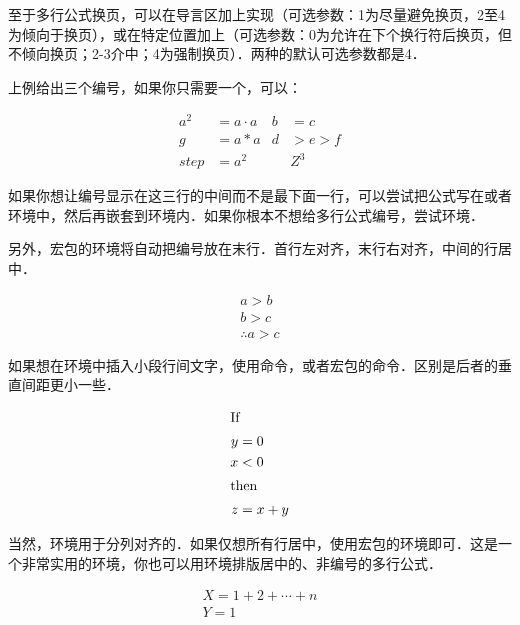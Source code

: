 至于多行公式换页，可以在导言区加上实现（可选参数：1为尽量避免换页，2至4为倾向于换页），或在特定位置加上（可选参数：0为允许在下个换行符后换页，但不倾向换页；2-3介中；4为强制换页）．两种的默认可选参数都是4．

上例给出三个编号，如果你只需要一个，可以：

\begin{codeshow}
\begin{align}
  a^2&= a\cdot a& b&=c\nonumber\\
  g  &= a*a & d&>e>f  \nonumber\\
  step&= a^2 & &Z^3
\end{align}
\end{codeshow}

如果你想让编号显示在这三行的中间而不是最下面一行，可以尝试把公式写在或者环境中，然后再嵌套到环境内．如果你根本不想给多行公式编号，尝试环境．

另外，宏包的环境将自动把编号放在末行．首行左对齐，末行右对齐，中间的行居中．
\begin{codeshow}
\begin{multline}
a>b \\
b>c \\
\therefore a>c
\end{multline}
\end{codeshow}

如果想在环境中插入小段行间文字，使用命令，或者宏包的命令．区别是后者的垂直间距更小一些．

\begin{codeshow}
\begin{align*}
\shortintertext{If}
 y &= 0 \\
 x &< 0\\
\shortintertext{then}
 z &= x+y
\end{align*}
\end{codeshow}

当然，环境用于分列对齐的．如果仅想所有行居中，使用宏包的环境即可．这是一个非常实用的环境，你也可以用环境排版居中的、非编号的多行公式．

\begin{codeshow}
\begin{gather}
  X=1+2+\cdots+n \\
  Y=1
\end{gather}
\end{codeshow}

